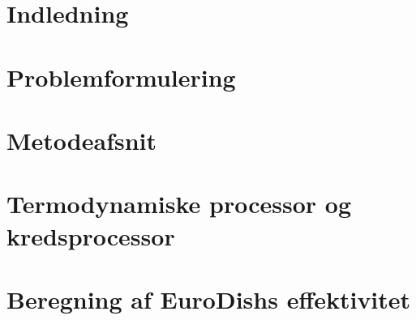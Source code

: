 \documentclass[12pt,a4paper]{article}
\author{Christian Kaae Larsen}
\begin{document}
	\tableofcontents
	
	\section{Indledning}
	
	
	\section{Problemformulering}
	
	
	\section{Metodeafsnit} %
	
	
	\section{Termodynamiske processor og kredsprocessor}
	
	
	\section{Beregning af EuroDishs effektivitet}
	
		
		
			
			
			
			
			
			
\end{document}

